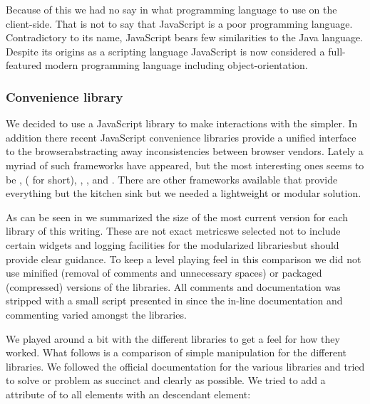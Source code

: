 Because of this we had no say in what programming language to use on the
client-side. That is not to say that JavaScript is a poor programming
language. Contradictory to its name, JavaScript bears few similarities to the
Java language.%
Despite its origins as a scripting language JavaScript is now considered
a full-featured modern programming language
 including object-orientation.

\subsubsection{Convenience library}

We decided to use a JavaScript library to make interactions with the
 simpler.
In addition there recent JavaScript convenience libraries provide a
unified interface to the browser\dash{}abstracting away inconsistencies
between browser vendors. Lately a myriad of such frameworks have appeared,
but the most interesting ones seems to be
,
 ( for short),
,
, and
.%
There are other frameworks available that provide everything but the kitchen
sink but we needed a lightweight or modular solution.

As can be seen in
we summarized the size of the most
current version for each library of this writing. These are not exact
metrics\dash{}we selected not to include certain widgets and logging
facilities for the modularized libraries\dash{}but should provide clear
guidance. To keep a level playing feel in this comparison we did not use
minified (removal of comments and unnecessary spaces) or packaged (compressed)
versions of the libraries. All comments and documentation was stripped with a
small script presented in 
since the in-line documentation and commenting varied amongst the libraries.

We played around a bit with the different libraries to get a feel for how
they worked. What follows is a comparison of simple  manipulation
for the different libraries. We followed the official documentation for the
various libraries and tried to solve or problem as succinct and clearly as
possible. We tried to add a  attribute of  to
all  elements with an descendant  element: 

